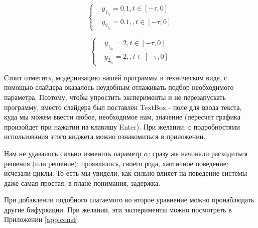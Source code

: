 \begin{equation}\label{lab6:eq4}
  \begin{cases}
    &y_{1_{t_0}} = 0.1, t \in [-\tau, 0]\\
    &y_{2_{t_0}} = 0.1, , t \in [-\tau, 0]
  \end{cases}
\end{equation}

\begin{equation}\label{lab6:eq5}
  \begin{cases}
    &y_{1_{t_0}} = 2, t \in [-\tau, 0]\\
    &y_{2_{t_0}} = 2, , t \in [-\tau, 0]
  \end{cases}
\end{equation}

Стоит отметить, модернизацию нашей программы в техническом
виде, с помощью слайдера оказалось неудобным отлаживать
подбор необходимого параметра. Поэтому, чтобы упростить
эксперименты и не перезапускать программу, вместо слайдера
был поставлен \textmd{TextBox} - поле для ввода текста, куда мы
можем ввести любое, необходимое нам, значение (пересчет
графика произойдет при нажатии на клавишу \textmd{Enter}).
При желании, с подробностями использования этого виджета
можно ознакомиться в приложении.

\clearpage
{}

Нам не удавалось сильно изменить параметр $\alpha$:
сразу же начинали расходиться решения (или решение);
проявлялось, своего рода, хаотичное поведение; исчезали циклы.
То есть мы увидели, как сильно влияет на поведение системы
даже самая простая, в плане понимания, задержка.

При добавлении подобного слагаемого во второе уравнение можно
пронаблюдать другие бифуркации. При желании, эти эксперименты
можно посмотреть в Приложении \ref{app:const}.
